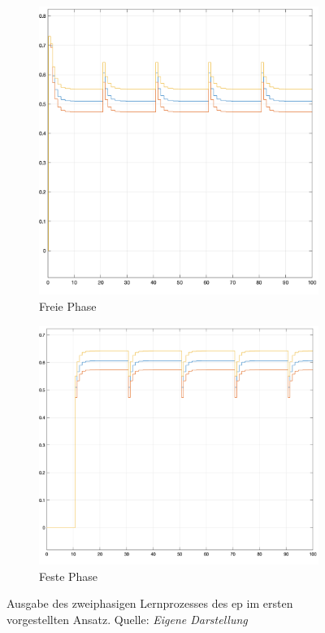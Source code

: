 \begin{figure}[h]
  \centering
  \begin{subfigure}[b]{0.5\textwidth}
    \includegraphics[width=\textwidth]{abbildungen/eqprop_discrete_free_output.png}
    \caption{Freie Phase}
  \end{subfigure}%
  \hfill
  \begin{subfigure}[b]{0.5\textwidth}
    \includegraphics[width=\textwidth]{abbildungen/eqprop_discrete_clamped_output.png}
    \caption{Feste Phase}
  \end{subfigure}
  \caption{Ausgabe des zweiphasigen Lernprozesses des \ac{ep} im ersten vorgestellten Ansatz. Quelle: \textit{Eigene Darstellung}}
  \label{fig:Output EqProp 1}
\end{figure}

